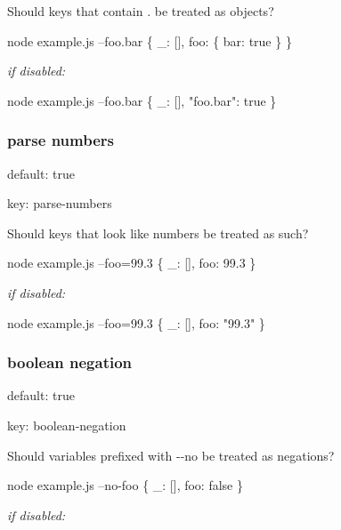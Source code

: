 Should keys that contain {\ttfamily .} be treated as objects?


\begin{DoxyCode}
node example.js --foo.bar
\{ \_: [], foo: \{ bar: true \} \}
\end{DoxyCode}


{\itshape if disabled\+:}


\begin{DoxyCode}
node example.js --foo.bar
\{ \_: [], "foo.bar": true \}
\end{DoxyCode}


\subsubsection*{parse numbers}


\begin{DoxyItemize}
\item default\+: {\ttfamily true}
\item key\+: {\ttfamily parse-\/numbers}
\end{DoxyItemize}

Should keys that look like numbers be treated as such?


\begin{DoxyCode}
node example.js --foo=99.3
\{ \_: [], foo: 99.3 \}
\end{DoxyCode}


{\itshape if disabled\+:}


\begin{DoxyCode}
node example.js --foo=99.3
\{ \_: [], foo: "99.3" \}
\end{DoxyCode}


\subsubsection*{boolean negation}


\begin{DoxyItemize}
\item default\+: {\ttfamily true}
\item key\+: {\ttfamily boolean-\/negation}
\end{DoxyItemize}

Should variables prefixed with {\ttfamily -\/-\/no} be treated as negations?


\begin{DoxyCode}
node example.js --no-foo
\{ \_: [], foo: false \}
\end{DoxyCode}


{\itshape if disabled\+:}


